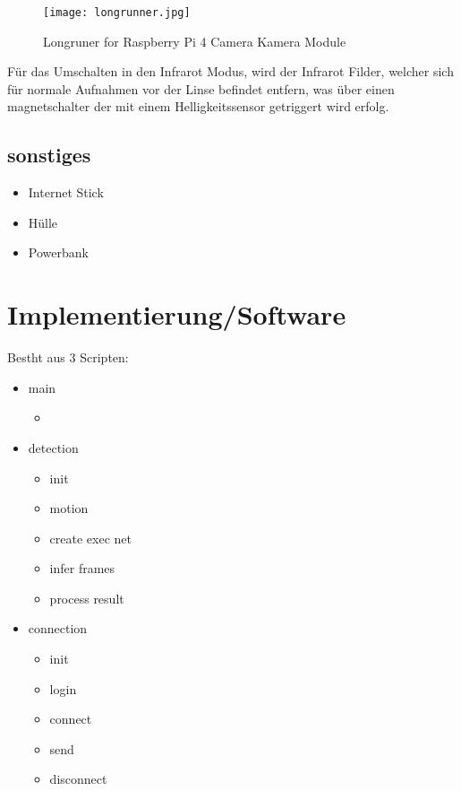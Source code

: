 \begin{figure}[H]
    \centering
    \texttt{[image: longrunner.jpg]}
    \caption{Longruner for Raspberry Pi 4 Camera Kamera Module}
    \label{fig:rpicam}
\end{figure}

Für das Umschalten in den Infrarot Modus, wird der Infrarot Filder, welcher sich 
für normale Aufnahmen vor der Linse befindet entfern, was über einen magnetschalter 
der mit einem Helligkeitssensor getriggert wird erfolg.

 

\subsection*{sonstiges}
\begin{itemize}
    \item Internet Stick%
    \item Hülle
    \item Powerbank
\end{itemize}

\section{Implementierung/Software}

Bestht aus 3 Scripten:

\begin{itemize}
    \item main
    \begin{itemize}
        \item 
    \end{itemize}
    \item detection
    \begin{itemize}
        \item init
        \item motion
        \item create exec net
        \item infer frames
        \item process result
    \end{itemize}
    \item connection
    \begin{itemize}
        \item init
        \item login
        \item connect
        \item send
        \item disconnect
    \end{itemize}
\end{itemize}


